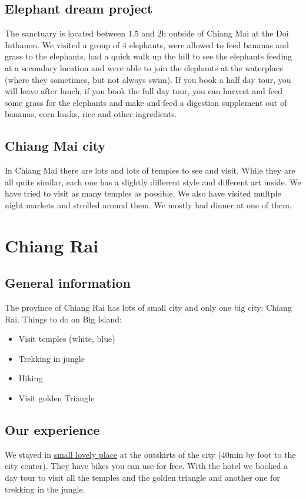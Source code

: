 \documentclass[11pt,a4paper,sans,english]{article}
\begin{document}
\subsection{Elephant dream project}
The sanctuary is located between 1.5 and 2h outside of Chiang Mai at the Doi Inthanon. We visited a group of 4 elephants, were allowed to feed bananas and grass to the elephants, had a quick walk up the hill to see the elephants feeding at a secondary location and were able to join the elephants at the waterplace (where they sometimes, but not always swim). If you book a half day tour, you will leave after lunch, if you book the full day tour, you can harvest and feed some grass for the elephants and make and feed a digestion supplement out of bananas, corn husks, rice and other ingredients.
\subsection{Chiang Mai city}
In Chiang Mai there are lots and lots of temples to see and visit. While they are all quite similar, each one has a slightly different style and different art inside. We have tried to visit as many temples as possible. We also have visited multple night markets and strolled around them. We mostly had dinner at one of them.

\section{Chiang Rai}
\subsection{General information}
The province of Chiang Rai has lots of small city and only one big city: Chiang Rai. 
Things to do on Big Island:
\begin{itemize}
	\itemsep-0.5em 
	\item Visit temples (white, blue)
	\item Trekking in jungle
	\item Hiking
	\item Visit golden Triangle
\end{itemize}
\subsection{Our experience}
We stayed in \href{https://www.booking.com/hotel/th/saikaew-resort.de.html?aid=318615&label=German_Switzerland_DE_CH_29561940745-4La_x1JtjPk4ljDcius9eQS640874808148\%3Apl\%3Ata\%3Ap1\%3Ap2\%3Aac\%3Aap\%3Aneg\%3Afi55583925958\%3Atidsa-302083110424\%3Alp1003277\%3Ali\%3Adec\%3Adm\%3Aag29561940745\%3Acmp313804345&sid=ef02e173088c39a4d4cfe3124886fffe&checkin=2023-10-21;checkout=2023-10-22;dest_id=-3247118;dest_type=city;dist=0;group_adults=4;group_children=0;hapos=1;hpos=1;no_rooms=2;req_adults=4;req_children=0;room1=A\%2CA;room2=A\%2CA;sb_price_type=total;soh=1;sr_order=popularity;srepoch=1691079435;srpvid=e10272814ca60095;type=total;ucfs=1&#no_availability_msg}{small lovely place} at the outskirts of the city (40min by foot to the city center). They have bikes you can use for free. With the hotel we booked a day tour to visit all the temples and the golden triangle and another one for trekking in the jungle.
\end{document}
